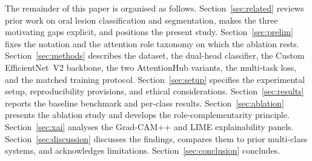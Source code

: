 The remainder of this paper is organised as follows.
Section~\ref{sec:related} reviews prior work on oral lesion classification and
segmentation, makes the three motivating gaps explicit, and positions the
present study. Section~\ref{sec:prelim} fixes the notation and the attention
role taxonomy on which the ablation rests. Section~\ref{sec:methods} describes
the dataset, the dual-head classifier, the Custom EfficientNet~V2 backbone, the
two AttentionHub variants, the multi-task loss, and the matched training
protocol. Section~\ref{sec:setup} specifies the experimental setup,
reproducibility provisions, and ethical considerations.
Section~\ref{sec:results} reports the baseline benchmark and per-class
results. Section~\ref{sec:ablation} presents the ablation study and develops
the role-complementarity principle. Section~\ref{sec:xai} analyses the
Grad-CAM++ and LIME explainability panels. Section~\ref{sec:discussion}
discusses the findings, compares them to prior multi-class systems, and
acknowledges limitations. Section~\ref{sec:conclusion} concludes.
